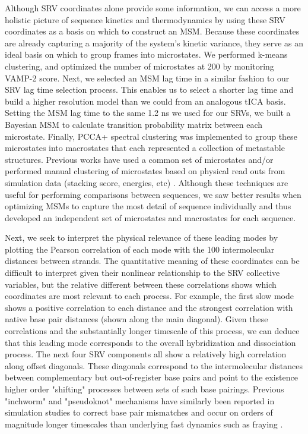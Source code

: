 \documentclass[journal=jpcbfk,manuscript=article]{achemso}
\begin{document}
Although SRV coordinates alone provide some information, we can access a more holistic picture of sequence kinetics and thermodynamics by using these SRV coordinates as a basis on which to construct an MSM. Because these coordinates are already capturing a majority of the system's kinetic variance, they serve as an ideal basis on which to group frames into microstates. We performed k-means clustering, and optimized the number of microstates at 200 by monitoring VAMP-2 score. Next, we selected an MSM lag time in a similar fashion to our SRV lag time selection process. This enables us to select a shorter lag time and build a higher resolution model than we could from an analogous tICA basis. Setting the MSM lag time to the same 1.2 ns we used for our SRVs, we built a Bayesian MSM to calculate transition probability matrix between each microstate. Finally, PCCA+ spectral clustering was implemented to group these microstates into macrostates that each represented a collection of metastable structures. Previous works have used a common set of microstates and/or performed manual clustering of microstates based on physical read outs from simulation data (stacking score, energies, etc) \citep{Pinamonti2017PredictingModels, PinamontiTheModels}. Although these techniques are useful for performing comparisons between sequences, we saw better results when optimizing MSMs to capture the most detail of sequence individually and thus developed an independent set of microstates and macrostates for each sequence. 

Next, we seek to interpret the physical relevance of these leading modes by plotting the Pearson correlation of each mode with the 100 intermolecular distances between strands. The quantitative meaning of these coordinates can be difficult to interpret given their nonlinear relationship to the SRV collective variables, but the relative different between these correlations shows which coordinates are most relevant to each process. For example, the first slow mode shows a positive correlation to each distance and the strongest correlation with native base pair distances (shown along the main diagonal). Given these correlations and the substantially longer timescale of this process, we can deduce that this leading mode corresponds to the overall hybridization and dissociation process. The next four SRV components all show a relatively high correlation along offset diagonals. These diagonals correspond to the intermolecular distances between complementary but out-of-register base pairs and point to the existence higher order "shifting" processes between sets of such base pairings. Previous "inchworm" and "pseudoknot" mechanisms have similarly been reported in simulation studies to correct base pair mismatches and occur on orders of magnitude longer timescales than underlying fast dynamics such as fraying \citep{Romano2013DNADependence, Markegard2015, Maciejczyk2014DNAModel}.
\end{document}
